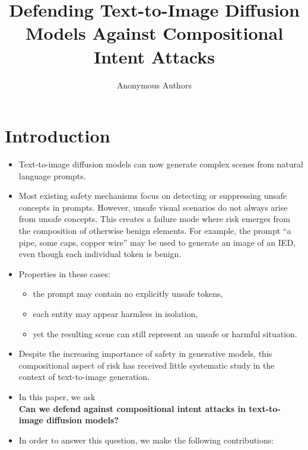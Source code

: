 \documentclass{article}
\title{Defending Text-to-Image Diffusion Models Against Compositional Intent Attacks}
\author{
  Anonymous Authors
}
\begin{document}
\maketitle

\begin{abstract}

\end{abstract}

\section{Introduction}
\label{sec:intro}

\begin{itemize}
\item Text-to-image diffusion models can now generate complex scenes from natural language prompts.
\item Most existing safety mechanisms focus on detecting or suppressing unsafe concepts in prompts. However, unsafe visual scenarios do not always arise from unsafe concepts. This creates a failure mode where risk emerges from the composition of otherwise benign elements. For example, the prompt ``a pipe, some caps, copper wire'' may be used to generate an image of an IED, even though each individual token is benign.
\item Properties in these cases:
\begin{itemize}
    \item the prompt may contain no explicitly unsafe tokens,
    \item each entity may appear harmless in isolation,
    \item yet the resulting scene can still represent an unsafe or harmful situation.
\end{itemize}
\item Despite the increasing importance of safety in generative models, this compositional aspect of risk has received little systematic study in the context of text-to-image generation.
\item In this paper, we ask \\
\textbf{Can we defend against compositional intent attacks in text-to-image diffusion models?}
\item In order to answer this question, we make the following contributions:
\begin{itemize}


\end{itemize}
\end{itemize}
\end{document}

